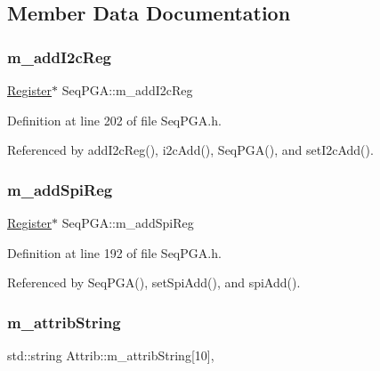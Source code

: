 \subsection{Member Data Documentation}
\mbox{\label{classSeqPGA_ac3a6aad3fec65ceb78528b6d20deeb3f}} 
\subsubsection{\texorpdfstring{m\+\_\+add\+I2c\+Reg}{m\_addI2cReg}}
{\footnotesize\ttfamily \hyperlink{classRegister}{Register}$\ast$ Seq\+P\+G\+A\+::m\+\_\+add\+I2c\+Reg\hspace{0.3cm}{\ttfamily [private]}}



Definition at line 202 of file Seq\+P\+G\+A.\+h.



Referenced by add\+I2c\+Reg(), i2c\+Add(), Seq\+P\+G\+A(), and set\+I2c\+Add().

\mbox{\label{classSeqPGA_af31d87ad56c501584ccb9c60776a1289}} 
\subsubsection{\texorpdfstring{m\+\_\+add\+Spi\+Reg}{m\_addSpiReg}}
{\footnotesize\ttfamily \hyperlink{classRegister}{Register}$\ast$ Seq\+P\+G\+A\+::m\+\_\+add\+Spi\+Reg\hspace{0.3cm}{\ttfamily [private]}}



Definition at line 192 of file Seq\+P\+G\+A.\+h.



Referenced by Seq\+P\+G\+A(), set\+Spi\+Add(), and spi\+Add().

\mbox{\label{classAttrib_a3414521d7a82476e874b25a5407b5e63}} 
\subsubsection{\texorpdfstring{m\+\_\+attrib\+String}{m\_attribString}}
{\footnotesize\ttfamily std\+::string Attrib\+::m\+\_\+attrib\+String\mbox{[}10\mbox{]}\hspace{0.3cm}{\ttfamily [protected]}, {\ttfamily [inherited]}}



